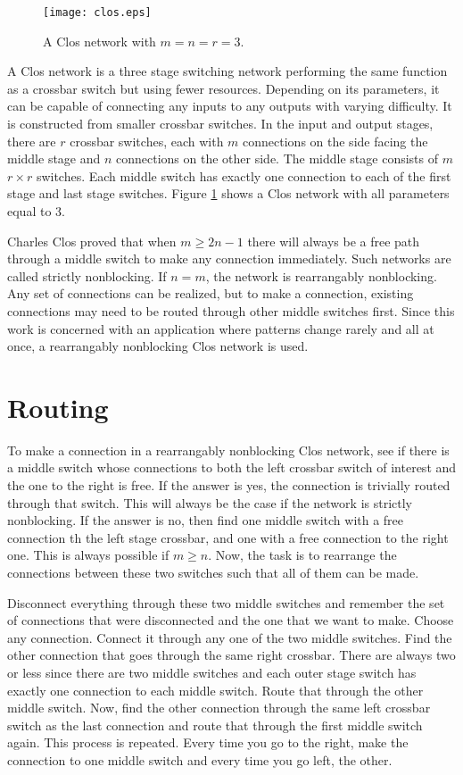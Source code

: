\documentclass[
	utf8,
	largesmallcaps,
	intlimits,
	widermath,
	sharecounter,
	nobreak,
	definition=marks,
	numbers,
	noparts
]{rtthesis}
\begin{document}
\begin{figure}
\begin{center}
\texttt{[image: clos.eps]}
\end{center}
\caption{
A Clos network with $m = n = r = 3$.
}
\label{fig:clos}
\end{figure}

A Clos network is a three stage switching network performing the same function
as a crossbar switch but using fewer resources. Depending on its parameters, it
can be capable of connecting any inputs to any outputs with varying difficulty.
It is constructed from smaller crossbar switches. In the input and output
stages, there are $r$ crossbar switches, each with $m$ connections on the side
facing the middle stage and $n$ connections on the other side. The middle stage
consists of $m$ $r \times r$ switches. Each middle switch has exactly one
connection to each of the first stage and last stage switches.  Figure
\ref{fig:clos} shows a Clos network with all parameters equal to 3.

Charles Clos proved that when $m \geq 2n - 1$ there will always be a free path
through a middle switch to make any connection immediately. Such networks are
called strictly nonblocking. If $n = m$, the network is rearrangably
nonblocking. Any set of connections can be realized, but to make a connection,
existing connections may need to be routed through other middle switches first.
Since this work is concerned with an application where patterns change rarely
and all at once, a rearrangably nonblocking Clos network is used.

\section{Routing}

To make a connection in a rearrangably nonblocking Clos network, see if there
is a middle switch whose connections to both the left crossbar switch of
interest and the one to the right is free. If the answer is yes, the connection
is trivially routed through that switch. This will always be the case if the
network is strictly nonblocking. If the answer is no, then find one middle
switch with a free connection th the left stage crossbar, and one with a free
connection to the right one. This is always possible if $m \geq n$. Now, the
task is to rearrange the connections between these two switches such that all
of them can be made.

Disconnect everything through these two middle switches and remember the set of
connections that were disconnected and the one that we want to make. Choose any
connection. Connect it through any one of the two middle switches. Find the
other connection that goes through the same right crossbar. There are always
two or less since there are two middle switches and each outer stage switch has
exactly one connection to each middle switch. Route that through the other
middle switch. Now, find the other connection through the same left crossbar
switch as the last connection and route that through the first middle switch
again. This process is repeated. Every time you go to the right, make the
connection to one middle switch and every time you go left, the other.
\end{document}
